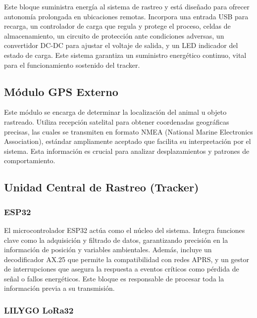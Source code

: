 \documentclass[conference]{IEEEtran}
\begin{document}
Este bloque suministra energía al sistema de rastreo y está diseñado para ofrecer autonomía prolongada en ubicaciones remotas. Incorpora una entrada USB para recarga, un controlador de carga que regula y protege el proceso, celdas de almacenamiento, un circuito de protección ante condiciones adversas, un convertidor DC-DC para ajustar el voltaje de salida, y un LED indicador del estado de carga. Este sistema garantiza un suministro energético continuo, vital para el funcionamiento sostenido del tracker.

\vspace{2mm}

\subsection{Módulo GPS Externo}

Este módulo se encarga de determinar la localización del animal u objeto rastreado. Utiliza recepción satelital para obtener coordenadas geográficas precisas, las cuales se transmiten en formato NMEA (National Marine Electronics Association), estándar ampliamente aceptado que facilita su interpretación por el sistema. Esta información es crucial para analizar desplazamientos y patrones de comportamiento.

\vspace{2mm}

\subsection{Unidad Central de Rastreo (Tracker)}

\subsubsection*{ESP32}

El microcontrolador ESP32 actúa como el núcleo del sistema. Integra funciones clave como la adquisición y filtrado de datos, garantizando precisión en la información de posición y variables ambientales. Además, incluye un decodificador AX.25 que permite la compatibilidad con redes APRS, y un gestor de interrupciones que asegura la respuesta a eventos críticos como pérdida de señal o fallos energéticos. Este bloque es responsable de procesar toda la información previa a su transmisión.

\vspace{2mm}

\subsubsection*{LILYGO LoRa32}
\end{document}

